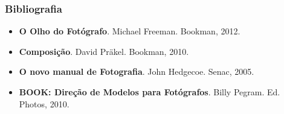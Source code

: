 

\begin{frame}
    \frametitle{Bibliografia}
    \begin{itemize}
      \item \textbf{O Olho do Fotógrafo}. Michael Freeman. Bookman, 2012.
      \item \textbf{Composição}. David Präkel. Bookman, 2010.
      \item \textbf{O novo manual de Fotografia}. John Hedgecoe. Senac, 2005.
      \item \textbf{BOOK: Direção de Modelos para Fotógrafos}. Billy Pegram. Ed. Photos, 2010.
    \end{itemize}
\end{frame}


